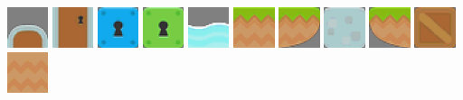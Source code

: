 \documentclass[10pt]{book}
\begin{document}
\begin{center}
\includegraphics[width=0.09\textwidth]{previews/kenney-TILES-09.png}
\includegraphics[width=0.09\textwidth]{previews/kenney-TILES-10.png}
\includegraphics[width=0.09\textwidth]{previews/kenney-TILES-11.png}
\includegraphics[width=0.09\textwidth]{previews/kenney-TILES-12.png}
\includegraphics[width=0.09\textwidth]{previews/kenney-TILES-13.png}
\includegraphics[width=0.09\textwidth]{previews/kenney-TILES-14.png}
\includegraphics[width=0.09\textwidth]{previews/kenney-TILES-15.png}
\includegraphics[width=0.09\textwidth]{previews/kenney-TILES-16.png}
\includegraphics[width=0.09\textwidth]{previews/kenney-TILES-17.png}
\includegraphics[width=0.09\textwidth]{previews/kenney-TILES-18.png}
\includegraphics[width=0.09\textwidth]{previews/kenney-TILES-19.png}
\end{center}
\end{document}
